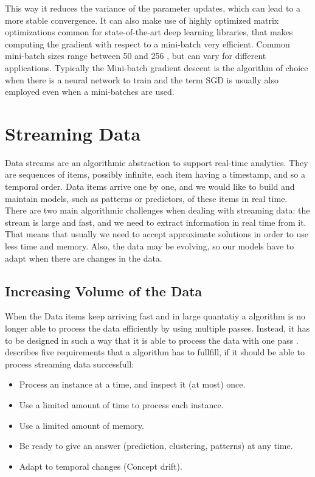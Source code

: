 \documentclass[12pt,oneside,a4paper,parskip]{scrbook}
\begin{document}
This way it reduces the variance of the parameter updates, which can lead to a more stable convergence.
It can also make use of highly optimized matrix optimizations common for state-of-the-art deep learning libraries,
that makes computing the gradient with respect to a mini-batch very efficient. 
Common mini-batch sizes range between 50 and 256 , but can vary for different applications. Typically the Mini-batch gradient descent is the 
algorithm of choice when there is a neural network to train and the term SGD is usually also employed even when a mini-batches
are used. \cite{overvieDiffRSLVQ}

\pagebreak

\section{Streaming Data}

Data streams are an algorithmic abstraction to support real-time analytics. They are sequences of items, 
possibly infinite, each item having a timestamp, and so a temporal order. Data items arrive one by one, 
and we would like to build and maintain models, such as patterns or predictors, of these items in real time. 
There are two main algorithmic challenges when dealing with streaming data: the stream is large and fast, 
and we need to extract information in real time from it. That means that usually we need to accept approximate 
solutions in order to use less time and memory.
Also, the data may be evolving, so our models have to adapt when there are changes in the data. \cite{MLonDataStreams}

\subsection{Increasing Volume of the Data}
When the Data items keep arriving fast and in large quantatiy a algorithm is no longer able to process the data efficiently
by using multiple passes. Instead, it has to be designed in such a way that it is able to process the data with one pass \cite{aggarwal2007data}.
\cite{MLonDataStreams} describes five requirements that a algorithm has to fullfill, if it should be able to process streaming data successfull:

\begin{itemize}
  \item Process an instance at a time, and inspect it (at most) once.
  \item Use a limited amount of time to process each instance.
  \item Use a limited amount of memory.
  \item Be ready to give an answer (prediction, clustering, patterns) at any time.
  \item Adapt to temporal changes (Concept drift).
  \label{enum:5requ}
\end{itemize}
\end{document}
